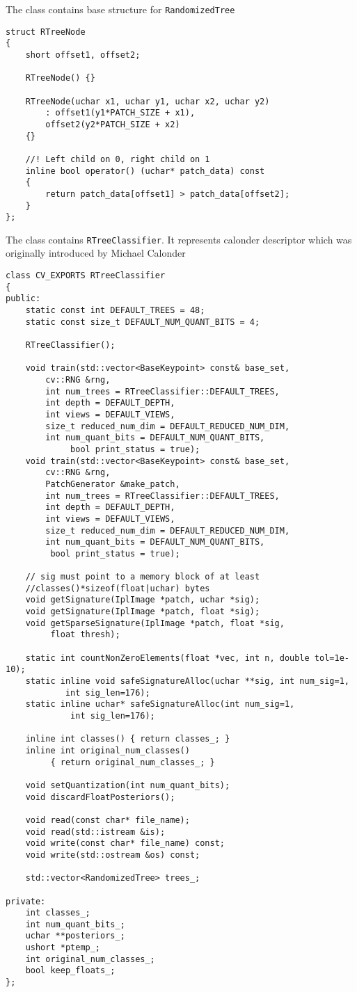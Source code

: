 		


The class contains base structure for \texttt{RandomizedTree}

\begin{lstlisting}
struct RTreeNode
{
	short offset1, offset2;

	RTreeNode() {}

	RTreeNode(uchar x1, uchar y1, uchar x2, uchar y2)
		: offset1(y1*PATCH_SIZE + x1),
		offset2(y2*PATCH_SIZE + x2)
	{}

	//! Left child on 0, right child on 1
	inline bool operator() (uchar* patch_data) const
	{
		return patch_data[offset1] > patch_data[offset2];
	}
};
\end{lstlisting}


The class contains \texttt{RTreeClassifier}. It represents calonder descriptor which was originally introduced by Michael Calonder

\begin{lstlisting}
class CV_EXPORTS RTreeClassifier
{   
public:
	static const int DEFAULT_TREES = 48;
	static const size_t DEFAULT_NUM_QUANT_BITS = 4;  

	RTreeClassifier();

	void train(std::vector<BaseKeypoint> const& base_set, 
		cv::RNG &rng,
		int num_trees = RTreeClassifier::DEFAULT_TREES,
		int depth = DEFAULT_DEPTH,
		int views = DEFAULT_VIEWS,
		size_t reduced_num_dim = DEFAULT_REDUCED_NUM_DIM,
		int num_quant_bits = DEFAULT_NUM_QUANT_BITS,
			 bool print_status = true);
	void train(std::vector<BaseKeypoint> const& base_set,
		cv::RNG &rng, 
		PatchGenerator &make_patch,
		int num_trees = RTreeClassifier::DEFAULT_TREES,
		int depth = DEFAULT_DEPTH,
		int views = DEFAULT_VIEWS,
		size_t reduced_num_dim = DEFAULT_REDUCED_NUM_DIM,
		int num_quant_bits = DEFAULT_NUM_QUANT_BITS,
		 bool print_status = true);

	// sig must point to a memory block of at least 
	//classes()*sizeof(float|uchar) bytes
	void getSignature(IplImage *patch, uchar *sig);
	void getSignature(IplImage *patch, float *sig);
	void getSparseSignature(IplImage *patch, float *sig,
		 float thresh);
		 
	static int countNonZeroElements(float *vec, int n, double tol=1e-10);
	static inline void safeSignatureAlloc(uchar **sig, int num_sig=1,
			int sig_len=176);
	static inline uchar* safeSignatureAlloc(int num_sig=1,
			 int sig_len=176);  

	inline int classes() { return classes_; }
	inline int original_num_classes()
		 { return original_num_classes_; }

	void setQuantization(int num_quant_bits);
	void discardFloatPosteriors();

	void read(const char* file_name);
	void read(std::istream &is);
	void write(const char* file_name) const;
	void write(std::ostream &os) const;

	std::vector<RandomizedTree> trees_;

private:    
	int classes_;
	int num_quant_bits_;
	uchar **posteriors_;
	ushort *ptemp_;
	int original_num_classes_;  
	bool keep_floats_;
};
\end{lstlisting}

